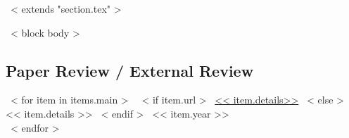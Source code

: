 ~< extends "section.tex" >~

~< block body >~
 \subsection{Paper Review / External Review}
  ~< for item in items.main >~
    ~< if item.url >~
      \href{<< item.url >>}{<< item.details>>}
    ~< else >~
      << item.details >>
    ~< endif >~
    \hfill << item.year >> \\
~< endfor >~

